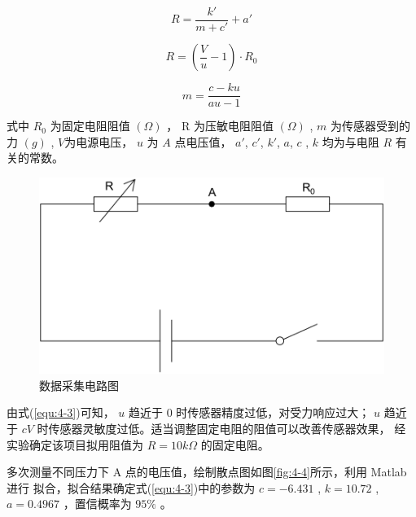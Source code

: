 \vspace{-10pt}
\begin{equation}
  \label{equ:4-1}
  R = \frac{{k'}}{{m + c'}} + a'
\end{equation}
\vspace{-30pt}

\begin{equation}
  \label{equ:4-2}
  R = (\frac{V}{u} - 1) \cdot {R_0}
\end{equation}
\vspace{-30pt}

\begin{equation}
  \label{equ:4-3}
  m = \frac{{c - ku}}{{au - 1}}
\end{equation}

式中 $R_0$ 为固定电阻阻值 $(\Omega )$ ， R 为压敏电阻阻值 $(\Omega )$ ,
$m$ 为传感器受到的力 $(g)$ , $V$为电源电压， $u$ 为 $A$ 点电压值，
$a'$, $c'$, $k'$, $a$, $c$ , $k$ 均为与电阻 $R$ 有关的常数。

\begin{figure}[!ht]
  \centering
  \includegraphics[scale=0.4]{chapter04/pic/4-3}
  \caption{数据采集电路图}
  \label{fig:4-3}
  \vspace{-0.3cm}
\end{figure}

由式(\ref{equ:4-3})可知， $u$ 趋近于 0 时传感器精度过低，对受力响应过大；
$u$ 趋近于 $cV$ 时传感器灵敏度过低。适当调整固定电阻的阻值可以改善传感器效果，
经实验确定该项目拟用阻值为 $R=10k\Omega$ 的固定电阻。

多次测量不同压力下 A 点的电压值，绘制散点图如图\ref{fig:4-4}所示，利用 Matlab 进行
拟合，拟合结果确定式(\ref{equ:4-3})中的参数为
$c = − 6.431$ , $ k = 10.72 $ , $a = 0.4967$ ，置信概率为 $95\%$ 。

